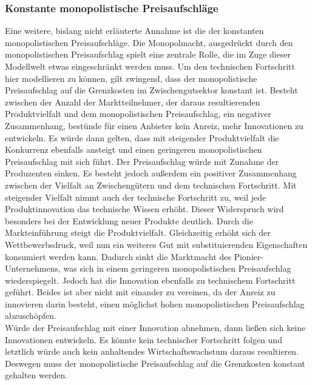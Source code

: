 \subsubsection{Konstante monopolistische Preisaufschläge}
Eine weitere, bislang nicht erläuterte Annahme ist die der konstanten monopolistischen Preisaufschläge. Die Monopolmacht, ausgedrückt durch den monopolistischen Preisaufschlag spielt eine zentrale Rolle, die im Zuge dieser Modellwelt etwas eingeschränkt werden muss. Um den technischen Fortschritt hier modellieren zu können, gilt zwingend, dass der monopolistische Preisaufschlag auf die Grenzkosten im Zwischengutsektor konstant ist. Besteht zwischen der Anzahl der Marktteilnehmer, der daraus resultierenden Produktvielfalt und dem monopolistischen Preisaufschlag, ein negativer Zusammenhang, bestünde für einen Anbieter kein Anreiz, mehr Innovationen zu entwickeln. Es würde dann gelten, dass mit steigender Produktvielfalt die Konkurrenz ebenfalls ansteigt und einen geringeren monopolistischen Preisaufschlag mit sich führt. Der Preisaufschlag würde mit Zunahme der Produzenten sinken. Es besteht jedoch außerdem ein positiver Zusammenhang zwischen der Vielfalt an Zwischengütern und dem technischen Fortschritt. Mit steigender Vielfalt nimmt auch der technische Fortschritt zu, weil jede Produktinnovation das technische Wissen erhöht. Dieser Widerspruch wird besonders bei der Entwicklung neuer Produkte deutlich. Durch die Markteinführung steigt die Produktvielfalt. Gleichzeitig erhöht sich der Wettbewerbsdruck, weil nun ein weiteres Gut mit substituierenden Eigenschaften konsumiert werden kann. Dadurch sinkt die Marktmacht des Pionier-Unternehmens, was sich in einem geringeren monopolistischen Preisaufschlag wiederspiegelt. Jedoch hat die Innovation ebenfalls zu technischem Fortschritt geführt. Beides ist aber nicht mit einander zu vereinen, da der Anreiz zu innovieren darin besteht, einen möglichst hohen monopolistischen Preisaufschlag abzuschöpfen. \\
%
Würde der Preisaufschlag mit einer Innovation abnehmen, dann ließen sich keine Innovationen entwickeln. Es könnte kein technischer Fortschritt folgen und letztlich würde auch kein anhaltendes Wirtschaftswachstum daraus resultieren. Deswegen muss der monopolistische Preisaufschlag auf die Grenzkosten konstant gehalten werden.
%
